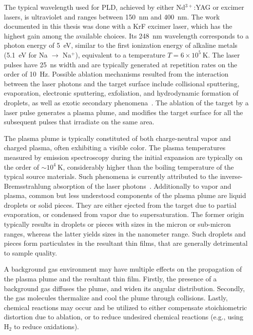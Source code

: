 The typical wavelength used for PLD, achieved by either Nd$^{3+}$:YAG or excimer lasers, is ultraviolet and ranges between \SI{150}{nm} and \SI{400}{nm}. The work documented in this thesis was done with a KrF excimer laser, which has the highest gain among the available choices. Its \SI{248}{nm} wavelength corresponds to a photon energy of \SI{5}{eV}, similar to the first ionization energy of alkaline metals (\SI{5.1}{eV} for Na $\to$ Na$^+$), equivalent to a temperature $T=6\times10^5~\mathrm{K}$. The laser pulses have \SI{25}{ns} width and are typically generated at repetition rates on the order of \SI{10}{Hz}. Possible ablation mechanisms resulted from the interaction between the laser photons and the target surface include collisional sputtering, evaporation, electronic sputtering, exfoliation, and hydrodynamic formation of droplets, as well as exotic secondary phenomena~\cite[sec.~3.3]{PLD_book}. The ablation of the target by a laser pulse generates a plasma plume, and modifies the target surface for all the subsequent pulses that irradiate on the same area.

The plasma plume is typically constituted of both charge-neutral vapor and charged plasma, often exhibiting a visible color. The plasma temperatures measured by emission spectroscopy during the initial expansion are typically on the order of $\sim10^4~\mathrm{K}$, considerably higher than the boiling temperature of the typical source materials. Such phenomena is currently attributed to the inverse-Bremsstrahlung absorption of the laser photons~\cite{Seely1973}. Additionally to vapor and plasma, common but less understood components of the plasma plume are liquid droplets or solid pieces. They are either ejected from the target due to partial evaporation, or condensed from vapor due to supersaturation. The former origin typically results in droplets or pieces with sizes in the micron or sub-micron ranges, whereas the latter yields sizes in the nanometer range. Such droplets and pieces form particulates in the resultant thin films, that are generally detrimental to sample quality.

A background gas environment may have multiple effects on the propagation of the plasma plume and the resultant thin film. Firstly, the presence of a background gas diffuses the plume, and widen its angular distribution. Secondly, the gas molecules thermalize and cool the plume through collisions. Lastly, chemical reactions may occur and be utilized to either compensate stoichiometric distortion due to ablation, or to reduce undesired chemical reactions (e.g., using H$_2$ to reduce oxidations).

